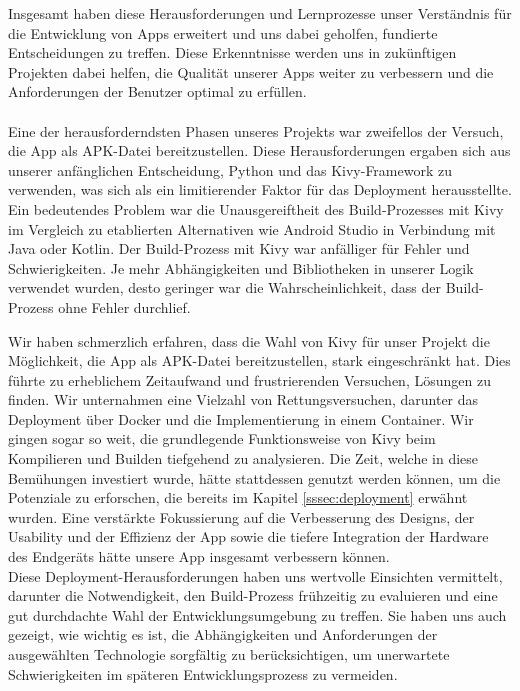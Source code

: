 Insgesamt haben diese Herausforderungen und Lernprozesse unser Verständnis für die Entwicklung von Apps erweitert und uns dabei geholfen, fundierte Entscheidungen zu treffen. Diese Erkenntnisse werden uns in zukünftigen Projekten dabei helfen, die Qualität unserer Apps weiter zu verbessern und die Anforderungen der Benutzer optimal zu erfüllen.
\\\\
Eine der herausforderndsten Phasen unseres Projekts war zweifellos der Versuch, die App als APK-Datei bereitzustellen. Diese Herausforderungen ergaben sich aus unserer anfänglichen Entscheidung, Python und das Kivy-Framework zu verwenden, was sich als ein limitierender Faktor für das Deployment herausstellte. Ein bedeutendes Problem war die Unausgereiftheit des Build-Prozesses mit Kivy im Vergleich zu etablierten Alternativen wie Android Studio in Verbindung mit Java oder Kotlin. Der Build-Prozess mit Kivy war anfälliger für Fehler und Schwierigkeiten. Je mehr Abhängigkeiten und Bibliotheken in unserer Logik verwendet wurden, desto geringer war die Wahrscheinlichkeit, dass der Build-Prozess ohne Fehler durchlief.

Wir haben schmerzlich erfahren, dass die Wahl von Kivy für unser Projekt die Möglichkeit, die App als APK-Datei bereitzustellen, stark eingeschränkt hat. Dies führte zu erheblichem Zeitaufwand und frustrierenden Versuchen, Lösungen zu finden. Wir unternahmen eine Vielzahl von Rettungsversuchen, darunter das Deployment über Docker und die Implementierung in einem Container. Wir gingen sogar so weit, die grundlegende Funktionsweise von Kivy beim Kompilieren und Builden tiefgehend zu analysieren.	Die Zeit, welche in diese Bemühungen investiert wurde, hätte stattdessen genutzt werden können, um die Potenziale zu erforschen, die bereits im Kapitel \ref{sssec:deployment} erwähnt wurden. Eine verstärkte Fokussierung auf die Verbesserung des Designs, der Usability und der Effizienz der App sowie die tiefere Integration der Hardware des Endgeräts hätte unsere App insgesamt verbessern können.
\\
Diese Deployment-Herausforderungen haben uns wertvolle Einsichten vermittelt, darunter die Notwendigkeit, den Build-Prozess frühzeitig zu evaluieren und eine gut durchdachte Wahl der Entwicklungsumgebung zu treffen. Sie haben uns auch gezeigt, wie wichtig es ist, die Abhängigkeiten und Anforderungen der ausgewählten Technologie sorgfältig zu berücksichtigen, um unerwartete Schwierigkeiten im späteren Entwicklungsprozess zu vermeiden.

